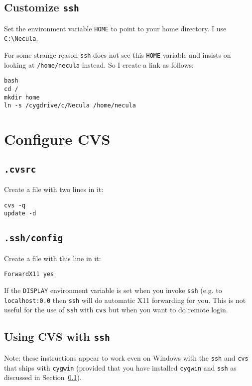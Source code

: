 \documentclass{article}
\def\t#1{{\tt #1}}
\begin{document}
 \subsection{Customize \t{ssh}}\label{sec-win-ssh}

 Set the environment variable \t{HOME} to point to your home directory. I use
 \t{C:\backslash Necula}. 

 For some strange reason \t{ssh} does not see this \t{HOME} variable and
insists on looking at \t{/home/necula} instead. So I create a link as follows:
\begin{verbatim}
bash
cd /
mkdir home
ln -s /cygdrive/c/Necula /home/necula
\end{verbatim}

\section{Configure CVS}

 \subsection{\t{.cvsrc}}

 Create a  file with two lines in it: 
\begin{verbatim}
cvs -q
update -d
\end{verbatim}

 \subsection{\t{.ssh/config}}

 Create a  file with this line in it:
\begin{verbatim}
ForwardX11 yes
\end{verbatim}

 If the \t{DISPLAY} environment variable is set when you invoke \t{ssh} (e.g.
to \t{localhost:0.0} then \t{ssh} will do automatic X11 forwarding for you.
This is not useful for the use of \t{ssh} with \t{cvs} but when you want to do
remote login. 

 \subsection{Using CVS with \t{ssh}}

 Note: these instructions appear to work even on Windows with the \t{ssh} and
\t{cvs} that ships with \t{cygwin} (provided that you have installed
\t{cygwin} and \t{ssh} as discussed in Section~\ref{sec-win-ssh}).
\end{document}
